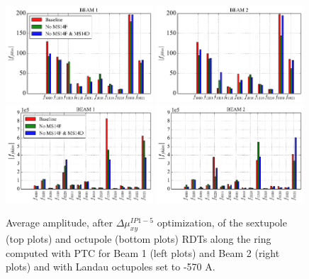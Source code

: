 \documentclass{cernatsnote}
\begin{document}
\begin{figure}[h!]
\centering
\includegraphics[width=0.49\textwidth]{images/rdt_sext_optics_compare_b1_570_noca.pdf} \hfill \includegraphics[width=0.49\textwidth]{images/rdt_sext_optics_compare_b2_570_noca.pdf} \\
\includegraphics[width=0.49\textwidth]{images/rdt_oct_optics_compare_b1_570_noca.pdf} \hfill \includegraphics[width=0.49\textwidth]{images/rdt_oct_optics_compare_b2_570_noca.pdf}
\caption{\label{rdt_ptc_all} Average amplitude, after $\Delta\mu_{xy}^{IP1-5}$ optimization, of the sextupole (top plots) and octupole (bottom plots) RDTs along the ring computed with PTC for Beam 1 (left plots) and Beam 2 (right plots) and with Landau octupoles set to -570 A.}
\end{figure}
\end{document}
